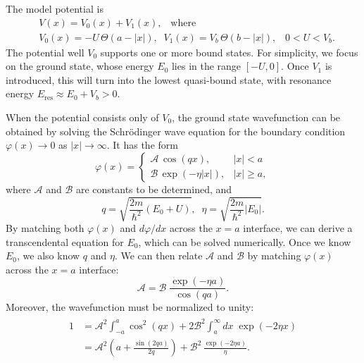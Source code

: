 \documentclass[pra,12pt]{revtex4}
\begin{document}
The model potential is
\begin{equation}
  \begin{aligned}&V(x) = V_0(x) + V_1(x), \;\;\;\mathrm{where} \\ &V_0(x) = -U \, \Theta(a-|x|), \;\; V_1(x) = V_b\, \Theta(b-|x|), \;\;\; 0<U<V_b.\end{aligned}
\end{equation}
The potential well $V_0$ supports one or more bound states.  For
simplicity, we focus on the ground state, whose energy $E_0$ lies in
the range $[-U,0]$.  Once $V_1$ is introduced, this will turn into the
lowest quasi-bound state, with resonance energy $E_{\mathrm{res}}
\approx E_0 + V_b > 0$.

When the potential consists only of $V_0$, the ground state
wavefunction can be obtained by solving the Schr\"odinger wave
equation for the boundary condition $\varphi(x) \rightarrow 0$ as
$|x|\rightarrow\infty$.  It has the form
\begin{equation}
  \varphi(x) = \begin{cases}\mathcal{A}\,\cos(qx), & |x| < a \\
    \mathcal{B} \, \exp\left(-\eta|x|\right), & |x| \ge a,\end{cases}
\end{equation}
where $\mathcal{A}$ and $\mathcal{B}$ are constants to be determined,
and
\begin{equation}
  q = \sqrt{\frac{2m}{\hbar^2}(E_0+U)}, \;\; \eta = \sqrt{\frac{2m}{\hbar^2}|E_0|}.
\end{equation}
By matching both $\varphi(x)$ and $d\varphi/dx$ across the $x=a$
interface, we can derive a transcendental equation for $E_0$, which
can be solved numerically.  Once we know $E_0$, we also know $q$ and
$\eta$.  We can then relate $\mathcal{A}$ and $\mathcal{B}$ by
matching $\varphi(x)$ across the $x=a$ interface:
\begin{equation}
  \mathcal{A} = \mathcal{B}\; \frac{\exp(-\eta a)}{\cos(qa)}.
\end{equation}
Moreover, the wavefunction must be normalized to unity:
\begin{align}
  \begin{aligned}1 &= \mathcal{A}^2 \int_{-a}^a \cos^2(qx) + 2\mathcal{B}^2 \int_a^\infty dx\; \exp(-2\eta x) \\ &= \mathcal{A}^2 \left(a+\frac{\sin(2qa)}{2q}\right) + \mathcal{B}^2\, \frac{\exp(-2\eta a)}{\eta}.\end{aligned}
\end{align}
\end{document}
